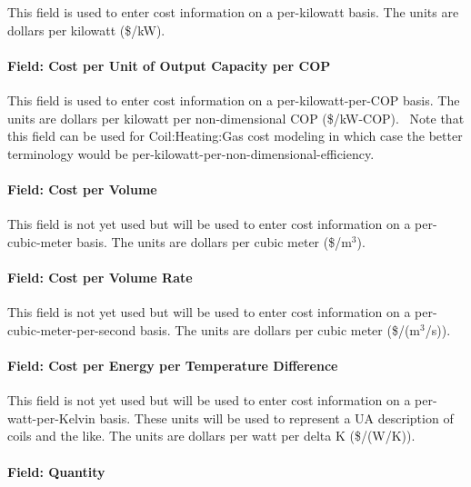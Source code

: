 This field is used to enter cost information on a per-kilowatt basis. The units are dollars per kilowatt (\$/kW).

\paragraph{Field: Cost per Unit of Output Capacity per COP}\label{field-cost-per-unit-of-output-capacity-per-cop}

This field is used to enter cost information on a per-kilowatt-per-COP basis. The units are dollars per kilowatt per non-dimensional COP (\$/kW-COP).~ Note that this field can be used for Coil:Heating:Gas cost modeling in which case the better terminology would be per-kilowatt-per-non-dimensional-efficiency.

\paragraph{Field: Cost per Volume}\label{field-cost-per-volume}

This field is not yet used but will be used to enter cost information on a per-cubic-meter basis. The units are dollars per cubic meter (\$/m\(^{3}\)).

\paragraph{Field: Cost per Volume Rate}\label{field-cost-per-volume-rate}

This field is not yet used but will be used to enter cost information on a per-cubic-meter-per-second basis. The units are dollars per cubic meter (\$/(m\(^{3}\)/s)).

\paragraph{Field: Cost per Energy per Temperature Difference}\label{field-cost-per-energy-per-temperature-difference}

This field is not yet used but will be used to enter cost information on a per-watt-per-Kelvin basis. These units will be used to represent a UA description of coils and the like. The units are dollars per watt per delta K (\$/(W/K)).

\paragraph{Field: Quantity}\label{field-quantity}

